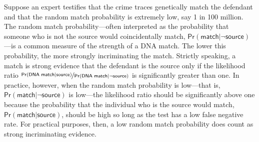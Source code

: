 \documentclass{article}
\newcommand{\pr}{\mathsf{Pr}}
\begin{document}
   
   Suppose an expert testifies that the crime traces genetically
match the defendant and  that the random match probability is extremely low, say 1 in 100 million. %
The random match probability---often interpreted as the probability that someone who is not the source would coincidentally match, $\pr(\textsf{match} \vert \neg \textsf{source})$---is a common measure of the strength of a DNA match. The lower this probability, the more strongly incriminating the match. %
Strictly speaking, a match  is strong evidence that the defendant is the source only if 
the likelihood ratio $\nicefrac{\pr(\textsf{DNA match} \vert \textsf{source})}{\pr(\textsf{DNA match} \vert \neg \textsf{source})}$ is significantly greater than one. 
   In practice, however, when the random match probability is low---that is,  $\pr(\textsf{match} \vert \neg \textsf{source})$ is low---the likelihood ratio should be significantly above one because the probability that the individual who is the source would match, $\pr(\textsf{match} \vert \textsf{source})$, should be high so long as the test has a  low false negative rate.  For practical purposes, then, a  low random match probability does count as strong incriminating evidence. 
\end{document}
